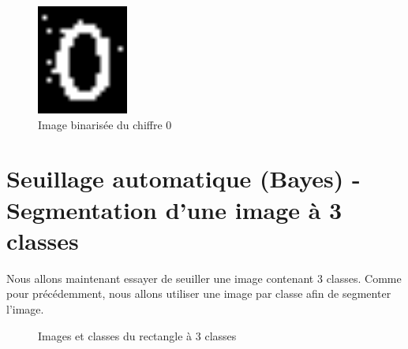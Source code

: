\documentclass[a4paper,11pt]{article}
\begin{document}
  \begin{figure}[H]
    \center
    \includegraphics[width=3cm]{resultat/binZeroBayes.png}
    \caption{Image binarisée du chiffre 0}
  \end{figure}
  
  \section{Seuillage automatique (Bayes) - Segmentation d’une image à 3 classes}
 
  Nous allons maintenant essayer de seuiller une image contenant 3 classes. Comme pour précédemment,
  nous allons utiliser une image par classe afin de segmenter l'image.
  
  \begin{figure}[H]
    \center
    \caption{Images et classes du rectangle à 3 classes}
  \end{figure}
  
\end{document}
